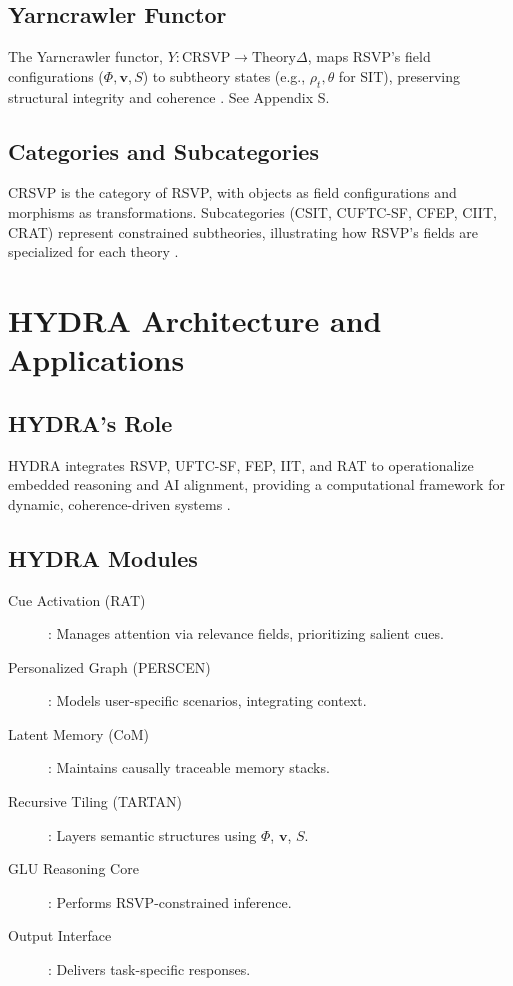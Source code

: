 \documentclass[12pt]{report}
\newcommand{\PhiRSVP}{\Phi}
\newcommand{\vRSVP}{\mathbf{v}}
\newcommand{\SRSVP}{S}
\begin{document}
\section{Yarncrawler Functor}
The Yarncrawler functor, \(Y: \text{CRSVP} \to \text{Theory}\Delta\), maps RSVP’s field configurations (\(\PhiRSVP, \vRSVP, \SRSVP\)) to subtheory states (e.g., \(\rho_t, \theta\) for SIT), preserving structural integrity and coherence \citep{SocioeconomicFunctors2025}. See Appendix S.

\section{Categories and Subcategories}
CRSVP is the category of RSVP, with objects as field configurations and morphisms as transformations. Subcategories (CSIT, CUFTC-SF, CFEP, CIIT, CRAT) represent constrained subtheories, illustrating how RSVP’s fields are specialized for each theory \citep{RSVPMeta2025}.

\chapter{HYDRA Architecture and Applications}
\section{HYDRA’s Role}
HYDRA integrates RSVP, UFTC-SF, FEP, IIT, and RAT to operationalize embedded reasoning and AI alignment, providing a computational framework for dynamic, coherence-driven systems \citep{HYDRA2025}.

\section{HYDRA Modules}
\begin{description}
    \item[Cue Activation (RAT)]: Manages attention via relevance fields, prioritizing salient cues.
    \item[Personalized Graph (PERSCEN)]: Models user-specific scenarios, integrating context.
    \item[Latent Memory (CoM)]: Maintains causally traceable memory stacks.
    \item[Recursive Tiling (TARTAN)]: Layers semantic structures using \(\PhiRSVP\), \(\vRSVP\), \(\SRSVP\).
    \item[GLU Reasoning Core]: Performs RSVP-constrained inference.
    \item[Output Interface]: Delivers task-specific responses.
\end{description}
\end{document}
